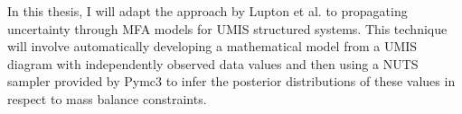 \documentclass[ %
                    author={Tom Jager},
                supervisor={Dr. Daniel Schien},
                    degree={MEng},
                     title={A Bayesian Inference Engine for Calibrating Uncertainty over UMIS Structured MFA Systems},
                  subtitle={},
                      type={research},
                      year={2019} ]{dissertation}
\begin{document}
In this thesis, I will adapt the approach by Lupton et al.  to  propagating uncertainty through MFA models for UMIS structured systems. This technique will involve automatically developing a mathematical model from a UMIS diagram with independently observed data values and then using a NUTS sampler provided by Pymc3 to infer the posterior distributions of these values in respect to mass balance constraints. 

\end{document}
